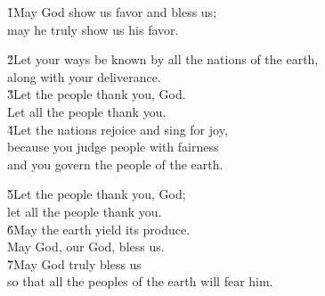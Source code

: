 \begin{poetry}
\poeml \v{1}May God show us favor and bless us; \\
\poemll    may he truly show us his favor.
\end{poetry}

\begin{poetry}
\poeml \v{2}Let your ways be known by all the nations of the earth, \\
\poemll    along with your deliverance. \\
\poeml \v{3}Let the people thank you, God. \\
\poemll    Let all the people thank you. \\
\poeml \v{4}Let the nations rejoice and sing for joy, \\
\poemll    because you judge people with fairness \\
\poemlll       and you govern the people of the earth.
\end{poetry}

\begin{poetry}
\poeml \v{5}Let the people thank you, God; \\
\poemll    let all the people thank you. \\
\poeml \v{6}May the earth yield its produce. \\
\poemll    May God, our God, bless us. \\
\poeml \v{7}May God truly bless us \\
\poemll    so that all the peoples of the earth will fear him.
\end{poetry}

